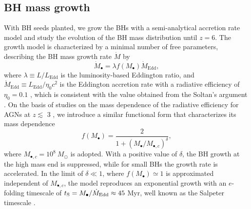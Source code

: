 \documentclass[twocolumn, twocolappendix]{aastex63}
\newcommand{\Msun}{M_\odot}
\newcommand{\Mbh}{M_\bullet}
\newcommand{\Mdot}{\dot{M}}
\newcommand{\blue}[1]{\textcolor{blue}{ #1}}
\begin{document}
\begin{CJK*}{UTF8}{gbsn}
\subsection{BH mass growth}
\label{sec:model}
With BH seeds planted, we grow the BHs with a semi-analytical accretion rate model and study the evolution of the BH mass distribution until $z=6$. 
The growth model is characterized by a minimal number of free parameters, 
describing the BH mass growth rate $\Mdot$ by
\begin{equation}
  \label{eq:mdot}
  \Mdot_\bullet = \lambda f(\Mbh) \Mdot_\mathrm{Edd} ,
\end{equation}
where $\lambda \equiv L/L_\mathrm{Edd}$ is the luminosity-based Eddington ratio,
and $\Mdot_\mathrm{Edd} \equiv L_{\mathrm{Edd}}/\eta_0 c^2$ is the Eddington accretion rate with a radiative efficiency of $\eta_0=0.1$ \citep{1973A&A....24..337S},
which is consistent with the value obtained from the Soltan's argument \citep[e.g.,][]{2002MNRAS.335..965Y,2010ApJ...725..388C}.
On the basis of studies on the mass dependence of the radiative efficiency for AGNs at $z\lesssim$ 3 
\citep{2008MNRAS.390..561C,2012ApJ...749..187L,2014ApJ...786..104U}, 
we introduce a similar functional form that characterizes its mass dependence 
%
\begin{equation}
f(\Mbh) = \frac{2}{1+\left(\Mbh /M_{\bullet,c} \right)^\delta}, 
\end{equation}
%
where $M_{\bullet,c}=10^8~\Msun$ is adopted.
With a positive value of $\delta$, the BH growth at the high mass end is suppressed, 
while for small BHs the growth rate is accelerated.
In the limit of $\delta \ll 1$, where $f(\Mbh) \simeq 1$ is approximated independent of $M_{\bullet,c}$, the model reproduces an exponential growth with an $e$-folding timescale of
$t_{\rm S} =  \Mbh/\Mdot_{\mathrm{Edd}} \approx 45$ Myr, well known as the Salpeter timescale \citep{1964ApJ...140..796S}.




\end{CJK*}
\end{document}
